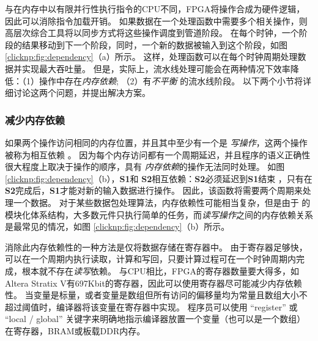 与在内存中以有限并行性执行指令的CPU不同，FPGA将操作合成为硬件逻辑，因此可以消除指令加载开销。
如果数据在一个处理函数中需要多个相关操作，则高层次综合工具将以同步方式将这些操作调度到管道阶段。
在每个时钟，一个阶段的结果移动到下一个阶段，同时，一个新的数据被输入到这个阶段，如图 \ref{clicknp:fig:dependency}（a）所示。
这样，处理函数可以在每个时钟周期处理数据并实现最大吞吐量。
但是，实际上，流水线处理可能会在两种情况下效率降低：（1）操作中存在\textit {内存依赖}; （2）有\textit {不平衡} 的流水线阶段。
以下两个小节将详细讨论这两个问题，并提出解决方案。



\subsubsection{减少内存依赖}


如果两个操作访问相同的内存位置，并且其中至少有一个是 \textit {写操作}，这两个操作被称为相互依赖 \cite {dependence}。
因为每个内存访问都有一个周期延迟，并且程序的语义正确性很大程度上取决于操作的顺序，具有 \textit {内存依赖}的操作无法同时处理。
如图 \ref {clicknp:fig:dependency}（b），\textbf {S1}和 \textbf {S2}相互依赖：\textbf {S2}必须延迟到\textbf {S1}结束 ，只有在\textbf {S2}完成后，\textbf {S1}才能对新的输入数据进行操作。
因此，该函数将需要两个周期来处理一个数据。
对于某些数据包处理算法，内存依赖性可能相当复杂，但是由于 \name 的模块化体系结构，大多数元件只执行简单的任务，而\textit {读写操作}之间的内存依赖关系是最常见的情况，如图 \ref{clicknp:fig:dependency}（b）所示。

消除此内存依赖性的一种方法是仅将数据存储在寄存器中。
由于寄存器足够快，可以在一个周期内执行读取，计算和写回，只要计算过程可在一个时钟周期内完成，根本就不存在\textit {读写}依赖。
与CPU相比，FPGA的寄存器数量要大得多，如Altera Stratix V有697Kbit的寄存器，因此可以使用寄存器尽可能减少内存依赖性。
当变量是标量，或者变量是数组但所有访问的偏移量均为常量且数组大小不超过阈值时，\name 编译器将该变量在寄存器中实现。
程序员可以使用 ``register'' 或 ``local / global'' 关键字来明确地指示编译器放置一个变量（也可以是一个数组）在寄存器，BRAM或板载DDR内存。


